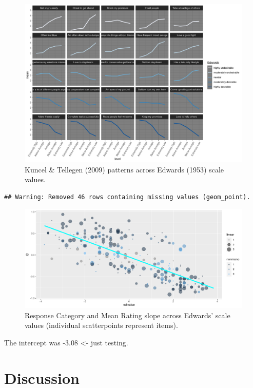 \documentclass[
  ,jou]{apa6}
\begin{document}
\begin{figure}
\centering
\includegraphics{KuncelTellegen_files/figure-latex/Figure2-1.pdf}
\caption{\label{fig:Figure2}Kuncel \& Tellegen (2009) patterns across Edwards (1953) scale values.}
\end{figure}

\begin{verbatim}
## Warning: Removed 46 rows containing missing values (geom_point).
\end{verbatim}

\begin{figure}
\centering
\includegraphics{KuncelTellegen_files/figure-latex/lastone-1.pdf}
\caption{\label{fig:lastone}Response Category and Mean Rating slope across Edwards' scale values (individual scatterpoints represent items).}
\end{figure}

The intercept was -3.08 \textless- just testing.

\hypertarget{discussion-1}{%
\section{Discussion}\label{discussion-1}}
\end{document}
